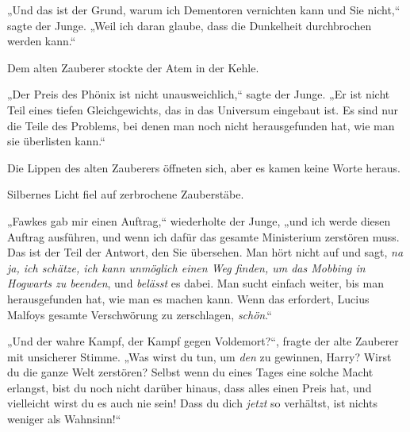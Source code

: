 „Und das ist der Grund, warum ich Dementoren vernichten kann und Sie nicht,“ sagte der Junge. „Weil ich daran glaube, dass die Dunkelheit durchbrochen werden kann.“

Dem alten Zauberer stockte der Atem in der Kehle.

„Der Preis des Phönix ist nicht unausweichlich,“ sagte der Junge. „Er ist nicht Teil eines tiefen Gleichgewichts, das in das Universum eingebaut ist. Es sind nur die Teile des Problems, bei denen man noch nicht herausgefunden hat, wie man sie überlisten kann.“

Die Lippen des alten Zauberers öffneten sich, aber es kamen keine Worte heraus.

Silbernes Licht fiel auf zerbrochene Zauberstäbe.

„Fawkes gab mir einen Auftrag,“ wiederholte der Junge, „und ich werde diesen Auftrag ausführen, und wenn ich dafür das gesamte Ministerium zerstören muss. Das ist der Teil der Antwort, den Sie übersehen. Man hört nicht auf und sagt, \emph{na ja, ich schätze, ich kann unmöglich einen Weg finden, um das Mobbing in Hogwarts zu beenden}, und \emph{belässt} es dabei. Man sucht einfach weiter, bis man herausgefunden hat, wie man es machen kann. Wenn das erfordert, Lucius Malfoys gesamte Verschwörung zu zerschlagen, \emph{schön}.“

„Und der wahre Kampf, der Kampf gegen Voldemort?“, fragte der alte Zauberer mit unsicherer Stimme. „Was wirst du tun, um \emph{den} zu gewinnen, Harry? Wirst du die ganze Welt zerstören? Selbst wenn du eines Tages eine solche Macht erlangst, bist du noch nicht darüber hinaus, dass alles einen Preis hat, und vielleicht wirst du es auch nie sein! Dass du dich \emph{jetzt} so verhältst, ist nichts weniger als Wahnsinn!“

